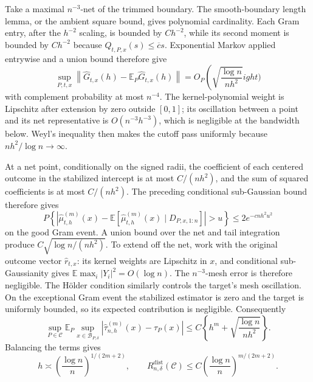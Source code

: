 Take a maximal \(n^{-3}\)-net of the trimmed boundary.  The smooth-boundary length lemma, or the ambient square bound, gives polynomial cardinality.  Each Gram entry, after the \(h^{-2}\) scaling, is bounded by \(Ch^{-2}\), while its second moment is bounded by \(Ch^{-2}\) because \(Q_{t,P,x}(s)\leq\overline c s\).  Exponential Markov applied entrywise and a union bound therefore give
\[
 \sup_{P,t,x}\left\|\widehat G_{t,x}(h)-
 \mathbb E_P\widehat G_{t,x}(h)\right\|
 =O_P\!\left(\sqrt{\frac{\log n}{nh^2}}
ight)
\]
with complement probability at most \(n^{-4}\).  The kernel-polynomial weight is Lipschitz after extension by zero outside \([0,1]\); its oscillation between a point and its net representative is \(O(n^{-3}h^{-3})\), which is negligible at the bandwidth below.  Weyl's inequality then makes the cutoff pass uniformly because \(nh^2/\log n\to\infty\).

At a net point, conditionally on the signed radii, the coefficient of each centered outcome in the stabilized intercept is at most \(C/(nh^2)\), and the sum of squared coefficients is at most \(C/(nh^2)\).  The preceding conditional sub-Gaussian bound therefore gives
\[
 P\!\left\{|\widehat\mu^{(m)}_{t,h}(x)
 -\mathbb E[\widehat\mu^{(m)}_{t,h}(x)\mid D_{P,x,1:n}]|>u\right\}
 \leq2e^{-cnh^2u^2}
\]
on the good Gram event.  A union bound over the net and tail integration produce \(C\sqrt{\log n/(nh^2)}\).  To extend off the net, work with the original outcome vector \(\widehat r_{t,x}\): its kernel weights are Lipschitz in \(x\), and conditional sub-Gaussianity gives \(\mathbb E\max_i|Y_i|^2=O(\log n)\).  The \(n^{-3}\)-mesh error is therefore negligible.  The H\"older condition similarly controls the target's mesh oscillation.  On the exceptional Gram event the stabilized estimator is zero and the target is uniformly bounded, so its expected contribution is negligible.  Consequently
\[
 \sup_{P\in\mathcal C}\mathbb E_P\sup_{x\in\mathcal B_{P,\delta}}
 |\widehat\tau^{(m)}_{n,h}(x)-\tau_P(x)|
 \leq C\left\{h^m+\sqrt{\frac{\log n}{nh^2}}\right\}.
\]
Balancing the terms gives
\[
 h\asymp\left(\frac{\log n}{n}\right)^{1/(2m+2)},
 \qquad
 R_{n,\delta}^{\mathrm{dist}}(\mathcal C)
 \leq C\left(\frac{\log n}{n}\right)^{m/(2m+2)}.
\]

